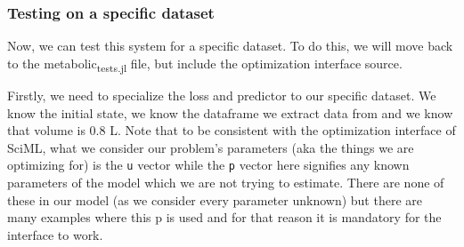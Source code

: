 \documentclass[11pt]{article}
\begin{document}
\subsubsection{Testing on a specific dataset}
\label{sec:org802ff69}
Now, we can test this system for a specific dataset. To do this, we will move back to the metabolic\textsubscript{tests.jl} file, but include the optimization interface source.

Firstly, we need to specialize the loss and predictor to our specific dataset. We know the initial state, we know the dataframe we extract data from and we know that volume is 0.8 L. Note that to be consistent with the optimization interface of SciML, what we consider our problem's parameters (aka the things we are optimizing for) is the \texttt{u} vector while the \texttt{p} vector here signifies any known parameters of the model which we are not trying to estimate. There are none of these in our model (as we consider every parameter unknown) but there are many examples where this p is used and for that reason it is mandatory for the interface to work.
\end{document}
